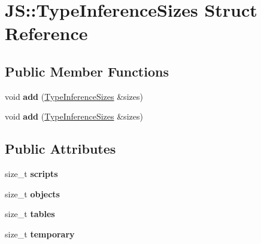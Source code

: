 \hypertarget{struct_j_s_1_1_type_inference_sizes}{\section{J\-S\-:\-:Type\-Inference\-Sizes Struct Reference}
\label{struct_j_s_1_1_type_inference_sizes}
}
\subsection*{Public Member Functions}
\begin{DoxyCompactItemize}
\item 
\hypertarget{struct_j_s_1_1_type_inference_sizes_aeca684a2cc3b53e7e72bd67ca2e99f97}{void {\bfseries add} (\hyperlink{struct_j_s_1_1_type_inference_sizes}{Type\-Inference\-Sizes} \&sizes)}\label{struct_j_s_1_1_type_inference_sizes_aeca684a2cc3b53e7e72bd67ca2e99f97}

\item 
\hypertarget{struct_j_s_1_1_type_inference_sizes_aeca684a2cc3b53e7e72bd67ca2e99f97}{void {\bfseries add} (\hyperlink{struct_j_s_1_1_type_inference_sizes}{Type\-Inference\-Sizes} \&sizes)}\label{struct_j_s_1_1_type_inference_sizes_aeca684a2cc3b53e7e72bd67ca2e99f97}

\end{DoxyCompactItemize}
\subsection*{Public Attributes}
\begin{DoxyCompactItemize}
\item 
\hypertarget{struct_j_s_1_1_type_inference_sizes_afcc7ed81b2edb72b4bc384d2bbb5d61d}{size\-\_\-t {\bfseries scripts}}\label{struct_j_s_1_1_type_inference_sizes_afcc7ed81b2edb72b4bc384d2bbb5d61d}

\item 
\hypertarget{struct_j_s_1_1_type_inference_sizes_ac20348016ce83f6908ca34d76ddfd888}{size\-\_\-t {\bfseries objects}}\label{struct_j_s_1_1_type_inference_sizes_ac20348016ce83f6908ca34d76ddfd888}

\item 
\hypertarget{struct_j_s_1_1_type_inference_sizes_a6a30e5115365ef28daa4f28f68ee4b5f}{size\-\_\-t {\bfseries tables}}\label{struct_j_s_1_1_type_inference_sizes_a6a30e5115365ef28daa4f28f68ee4b5f}

\item 
\hypertarget{struct_j_s_1_1_type_inference_sizes_a1c806ab2bd512f942d575ce2d52a5c63}{size\-\_\-t {\bfseries temporary}}\label{struct_j_s_1_1_type_inference_sizes_a1c806ab2bd512f942d575ce2d52a5c63}

\end{DoxyCompactItemize}


